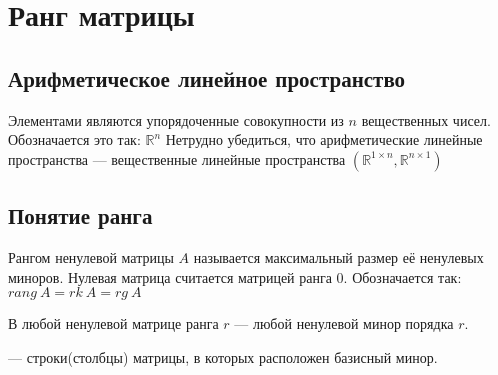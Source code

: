 \chapter{Ранг матрицы}
\section{Арифметическое линейное пространство}
\begin{opred}
Элементами  являются упорядоченные совокупности из $n$ вещественных чисел. Обозначается это так: $\mathbb{R}^n$ Нетрудно убедиться, что арифметические линейные пространства --- вещественные линейные пространства $(\mathbb{R}^{1\times{}n},\mathbb{R}^{n\times1})$
\end{opred}
\section{Понятие ранга}
\begin{opred}
Рангом ненулевой матрицы $A$ называется максимальный размер её ненулевых миноров. Нулевая матрица считается матрицей ранга 0. Обозначается так: $rang\ A=rk\ A=rg\ A$
\end{opred}
\begin{opred}
В любой ненулевой матрице ранга $r$  --- любой ненулевой минор порядка $r$.
\end{opred}
\begin{opred}
 --- строки(столбцы) матрицы, в которых расположен базисный минор.
\end{opred}
